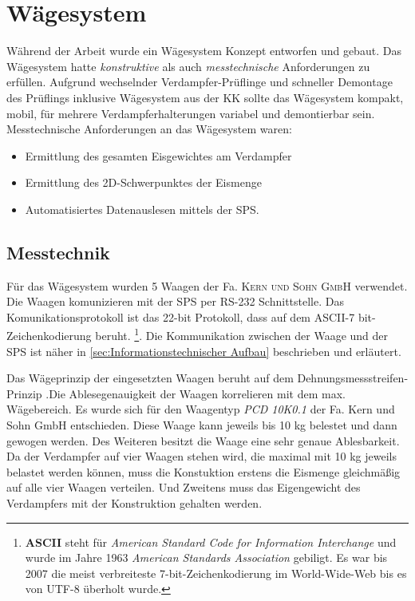 \section{Wägesystem}
\label{sec:Wägesystem}

Während der Arbeit wurde ein Wägesystem Konzept entworfen und gebaut. Das Wägesystem hatte \textit{konstruktive} als auch \textit{messtechnische} Anforderungen zu erfüllen. Aufgrund wechselnder Verdampfer-Prüflinge und schneller Demontage des Prüflings inklusive Wägesystem aus der KK sollte das Wägesystem  kompakt, mobil, für mehrere Verdampferhalterungen variabel und demontierbar sein. 
Messtechnische Anforderungen an das Wägesystem waren:

\begin{itemize}
\item Ermittlung des gesamten Eisgewichtes am Verdampfer
\item Ermittlung des 2D-Schwerpunktes der Eismenge
\item Automatisiertes Datenauslesen mittels der SPS.
\end{itemize}

\subsection{Messtechnik}
\label{subsec:Waagen-Messtechnik}

Für das Wägesystem wurden 5 Waagen der Fa. \textsc{Kern und Sohn GmbH} verwendet. Die Waagen komunizieren mit der SPS per RS-232 Schnittstelle. Das Komunikationsprotokoll ist das 22-bit Protokoll, dass auf dem \textsc{ASCII}-7 bit- Zeichenkodierung beruht. \footnote{\textbf{ASCII} steht für \textit{American Standard Code for Information Interchange} und wurde im Jahre 1963  \textit{American Standards Association} gebiligt. Es war bis 2007 die meist verbreiteste 7-bit-Zeichenkodierung im World-Wide-Web bis es von UTF-8 überholt wurde.}. Die Kommunikation zwischen der Waage und der SPS ist näher in \ref{sec:Informationstechnischer Aufbau} beschrieben und erläutert.

Das Wägeprinzip der eingesetzten Waagen beruht auf dem Dehnungsmessstreifen-Prinzip .Die Ablesegenauigkeit der Waagen korrelieren mit dem max. Wägebereich. Es wurde sich für den Waagentyp \textit{PCD 10K0.1} der Fa. Kern und Sohn GmbH entschieden. Diese Waage kann  jeweils  bis 10 kg belestet und dann gewogen werden. Des Weiteren besitzt die Waage eine sehr genaue Ablesbarkeit. Da der Verdampfer auf vier Waagen stehen wird, die maximal mit 10 kg jeweils belastet werden können, muss die Konstuktion erstens die Eismenge gleichmäßig auf alle vier Waagen verteilen. Und Zweitens muss das Eigengewicht des Verdampfers mit der Konstruktion gehalten werden. 


